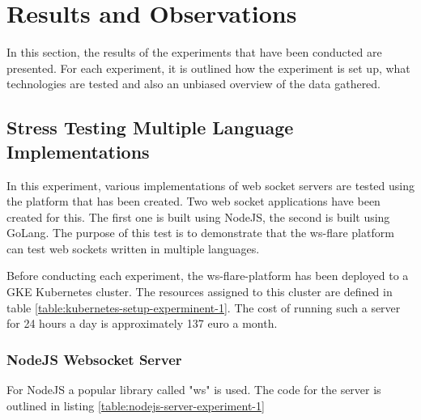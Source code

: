 \chapter{Results and Observations}

In this section, the results of the experiments that have been conducted are presented. For each experiment, it is outlined how the experiment is set up, what technologies are tested and also an unbiased overview of the data gathered.

\section{Stress Testing Multiple Language Implementations}

In this experiment, various implementations of web socket servers are tested using the platform that has been created. Two web socket applications have been created for this. The first one is built using NodeJS, the second is built using GoLang. The purpose of this test is to demonstrate that the ws-flare platform can test web sockets written in multiple languages.

Before conducting each experiment, the ws-flare-platform has been deployed to a GKE Kubernetes cluster. The resources assigned to this cluster are defined in table \ref{table:kubernetes-setup-experminent-1}. The cost of running such a server for 24 hours a day is approximately 137 euro a month.

\begin{table}[H]
\caption{Kubernetes Setup}
\label{table:kubernetes-setup-experminent-1}
\end{table}

\subsection{NodeJS Websocket Server}

For NodeJS a popular library called "ws" is used. The code for the server is outlined in listing \ref{table:nodejs-server-experiment-1}

